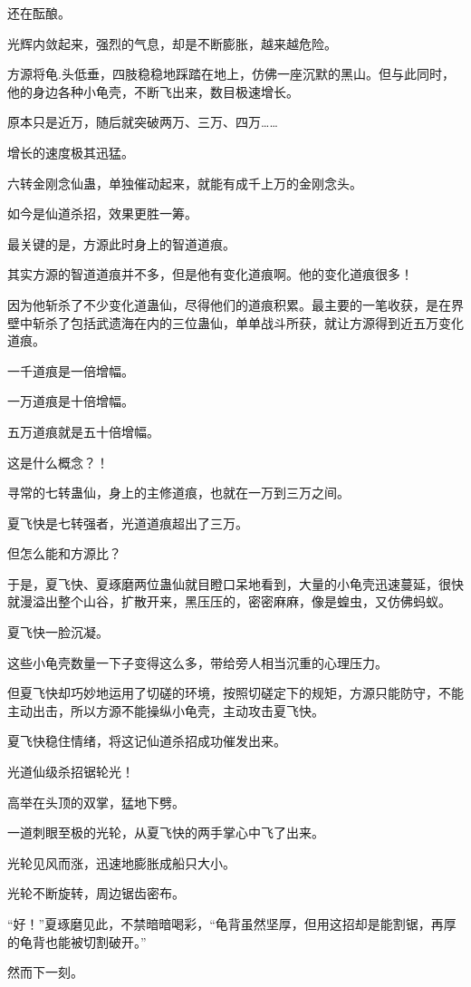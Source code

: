 \begin{this_body}
还在酝酿。

光辉内敛起来，强烈的气息，却是不断膨胀，越来越危险。

方源将龟.头低垂，四肢稳稳地踩踏在地上，仿佛一座沉默的黑山。但与此同时，他的身边各种小龟壳，不断飞出来，数目极速增长。

原本只是近万，随后就突破两万、三万、四万……

增长的速度极其迅猛。

六转金刚念仙蛊，单独催动起来，就能有成千上万的金刚念头。

如今是仙道杀招，效果更胜一筹。

最关键的是，方源此时身上的智道道痕。

其实方源的智道道痕并不多，但是他有变化道痕啊。他的变化道痕很多！

因为他斩杀了不少变化道蛊仙，尽得他们的道痕积累。最主要的一笔收获，是在界壁中斩杀了包括武遗海在内的三位蛊仙，单单战斗所获，就让方源得到近五万变化道痕。

一千道痕是一倍增幅。

一万道痕是十倍增幅。

五万道痕就是五十倍增幅。

这是什么概念？！

寻常的七转蛊仙，身上的主修道痕，也就在一万到三万之间。

夏飞快是七转强者，光道道痕超出了三万。

但怎么能和方源比？

于是，夏飞快、夏琢磨两位蛊仙就目瞪口呆地看到，大量的小龟壳迅速蔓延，很快就漫溢出整个山谷，扩散开来，黑压压的，密密麻麻，像是蝗虫，又仿佛蚂蚁。

夏飞快一脸沉凝。

这些小龟壳数量一下子变得这么多，带给旁人相当沉重的心理压力。

但夏飞快却巧妙地运用了切磋的环境，按照切磋定下的规矩，方源只能防守，不能主动出击，所以方源不能操纵小龟壳，主动攻击夏飞快。

夏飞快稳住情绪，将这记仙道杀招成功催发出来。

光道仙级杀招锯轮光！

高举在头顶的双掌，猛地下劈。

一道刺眼至极的光轮，从夏飞快的两手掌心中飞了出来。

光轮见风而涨，迅速地膨胀成船只大小。

光轮不断旋转，周边锯齿密布。

“好！”夏琢磨见此，不禁暗暗喝彩，“龟背虽然坚厚，但用这招却是能割锯，再厚的龟背也能被切割破开。”

然而下一刻。


\end{this_body}

